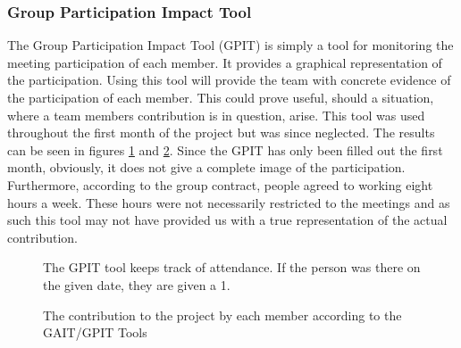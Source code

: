 \subsubsection{Group Participation Impact Tool}
The Group Participation Impact Tool (GPIT) is simply a tool for monitoring the meeting participation of each member. It provides a graphical representation of the participation. Using this tool will provide the team with concrete evidence of the participation of each member. This could prove useful, should a situation, where a team members contribution is in question, arise. This tool was used throughout the first month of the project but was since neglected. The results can be seen in figures \ref{fig:GPIT} and \ref{fig:GPITGraph}. Since the GPIT has only been filled out the first month, obviously, it does not give a complete image of the participation. Furthermore, according to the group contract, people agreed to working eight hours a week. These hours were not necessarily restricted to the meetings and as such this tool may not have provided us with a true representation of the actual contribution.


\begin{figure}[h!]
	\caption[The GPIT tool]{The GPIT tool keeps track of attendance. If the person was there on the given date, they are given a 1.}
	\label{fig:GPIT}
\end{figure}

\begin{figure}[h!]
	\caption[The contribution by each member]{The contribution to the project by each member according to the GAIT/GPIT Tools}
	\label{fig:GPITGraph}
\end{figure}